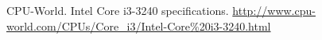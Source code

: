 \documentclass[letterpaper, 10 pt,spanish, conference]{ieeeconf}  %
\begin{document}



\begin{thebibliography}{99}

 CPU-World. Intel Core i3-3240 specifications. \url{http://www.cpu-world.com/CPUs/Core_i3/Intel-Core\%20i3-3240.html}







\end{thebibliography}
\end{document}
